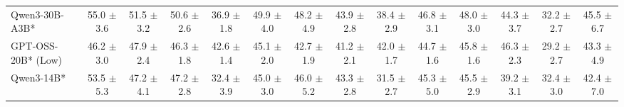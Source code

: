 \documentclass{llmxive}
\begin{document}
\begin{table}[t]
{\begin{tabular}{l *{13}{c}}


 
\rowcolor{gray!10}
 Qwen3-30B-A3B* &
55.0 {\tiny$\pm$ 3.6} & 
51.5 {\tiny$\pm$ 3.2} & 
50.6 {\tiny$\pm$ 2.6} & 
36.9 {\tiny$\pm$ 1.8} &
49.9 {\tiny$\pm$ 4.0} & 
48.2 {\tiny$\pm$ 4.9} & 
43.9 {\tiny$\pm$ 2.8} & 
38.4 {\tiny$\pm$ 2.9} &
46.8 {\tiny$\pm$ 3.1} & 
48.0 {\tiny$\pm$ 3.0} & 
44.3 {\tiny$\pm$ 3.7} & 
32.2 {\tiny$\pm$ 2.7} &
45.5 {\tiny$\pm$ 6.7} \\

 

GPT-OSS-20B* (Low)	&
46.2 {\tiny$\pm$ 3.0} &
47.9 {\tiny$\pm$ 2.4} &
46.3 {\tiny$\pm$ 1.8} &
42.6 {\tiny$\pm$ 1.4} &
45.1 {\tiny$\pm$ 2.0} &
42.7 {\tiny$\pm$ 1.9} &
41.2 {\tiny$\pm$ 2.1} &
42.0 {\tiny$\pm$ 1.7} &
44.7 {\tiny$\pm$ 1.6} &
45.8 {\tiny$\pm$ 1.6} &
46.3 {\tiny$\pm$ 2.3} &
29.2 {\tiny$\pm$ 2.7} &
43.3 {\tiny$\pm$ 4.9} \\

	

\rowcolor{gray!10}
 Qwen3-14B* &
53.5 {\tiny$\pm$ 5.3} & 
47.2 {\tiny$\pm$ 4.1} & 
47.2 {\tiny$\pm$ 2.8} & 
32.4 {\tiny$\pm$ 3.9} &
45.0 {\tiny$\pm$ 3.0} & 
46.0 {\tiny$\pm$ 5.2} & 
43.3 {\tiny$\pm$ 2.8} & 
31.5 {\tiny$\pm$ 2.7} &
45.3 {\tiny$\pm$ 5.0} & 
45.5 {\tiny$\pm$ 2.9} & 
39.2 {\tiny$\pm$ 3.1} & 
32.4 {\tiny$\pm$ 3.0} &
42.4 {\tiny$\pm$ 7.0} \\





\end{tabular}}
\end{table}
\end{document}
